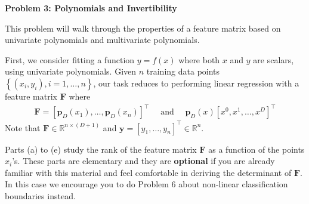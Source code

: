 \documentclass{article}\usepackage[utf8]{inputenc}\usepackage[margin=0.4cm,top=0.4cm,bottom=0.4cm]{geometry}\usepackage[usenames,dvipsnames,svgnames,table]{xcolor}
\begin{document}
\vspace{-2mm}\noindent\begin{mybox}{\begin{center}\textbf{\color{black}Problem 3: Polynomials and Invertibility}\end{center}}\end{mybox}\vspace{-2mm}
\vspace{10pt}
\noindent This problem will walk through the properties of a feature matrix based on univariate polynomials and multivariate polynomials.
\vspace{4pt}

\noindent First, we consider fitting a function $y = f(x)$ where both $x$ and $y$ are scalars, using univariate polynomials. Given $n$ training data points $\left\{(x_i, y_i), i=1, \ldots, n\right\}$, our task reduces to performing linear regression with a feature matrix $\mathbf{F}$ where \begin{align*}\mathbf{F}=\left[\mathbf{p}_D(x_1),\ldots,\mathbf{p}_D(x_n)\right]^\top\quad\text{ and }\quad \mathbf{p}_D(x)\left[x^0,x^1,\ldots,x^D\right]^\top\end{align*} Note that $\mathbf{F}\in\mathbb{R}^{n\times(D+1)}$ and $\mathbf{y}=[y_1,\ldots,y_n]^\top\in\mathbb{R}^n$.
\vspace{4pt}

\noindent Parts (a) to (e) study the rank of the feature matrix $\mathbf{F}$ as a function of the points $x_i$'s. These parts are elementary and they are \textbf{optional} if you are already familiar with this material and feel comfortable in deriving the determinant of $\mathbf{F}$. In this case we encourage you to do Problem 6 about non-linear classification boundaries instead.
\vspace{4pt}
\end{document}
